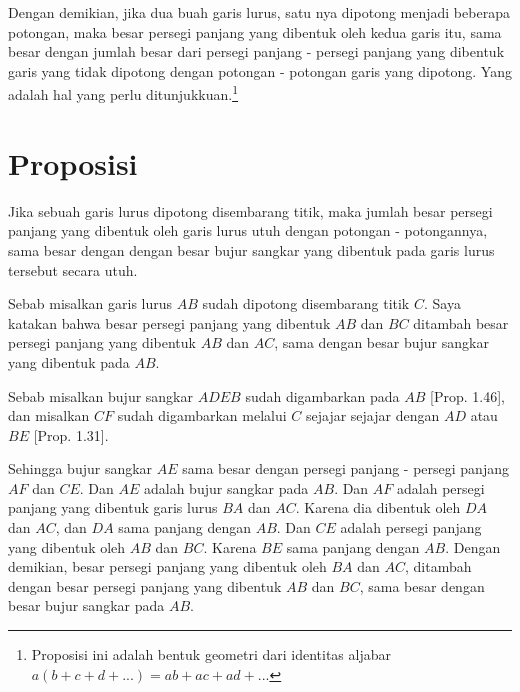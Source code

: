 \documentclass[a4paper]{book}
\begin{document}
Dengan demikian, jika dua buah garis lurus, satu nya dipotong menjadi beberapa
potongan, maka besar persegi panjang yang dibentuk oleh kedua garis itu, sama
besar dengan jumlah besar dari persegi panjang - persegi panjang yang dibentuk 
garis yang tidak dipotong dengan potongan - potongan garis yang dipotong.
Yang adalah hal yang perlu ditunjukkuan.\footnote {Proposisi ini adalah
bentuk geometri dari identitas aljabar $a(b + c + d +...) = ab +ac + ad + ...$}

\section*{\centering Proposisi \thesection} 

Jika sebuah garis lurus dipotong disembarang titik, maka jumlah besar persegi
 panjang yang dibentuk oleh garis lurus utuh dengan potongan 
- potongannya, sama besar dengan dengan besar bujur sangkar yang dibentuk pada garis 
lurus tersebut secara utuh. 
\begin{center}
\end{center}
Sebab misalkan garis lurus $AB$ sudah dipotong disembarang titik $C$. Saya
katakan bahwa besar persegi panjang yang dibentuk $AB$ dan $BC$ ditambah besar persegi
panjang yang dibentuk $AB$ dan $AC$, sama dengan besar bujur sangkar yang dibentuk 
pada $AB$.

Sebab misalkan bujur sangkar $ADEB$ sudah digambarkan pada $AB$ [Prop. 1.46],
dan misalkan $CF$ sudah digambarkan melalui $C$ sejajar sejajar dengan 
$AD$ atau $BE$ [Prop. 1.31].

Sehingga bujur sangkar $AE$ sama besar dengan persegi panjang - persegi panjang 
$AF$ dan $CE$. Dan $AE$ adalah bujur sangkar pada $AB$. Dan $AF$ adalah persegi
panjang yang dibentuk garis lurus $BA$ dan $AC$. Karena dia dibentuk oleh $DA$
dan $AC$, dan $DA$ sama panjang dengan $AB$. Dan $CE$ adalah persegi panjang 
yang dibentuk oleh $AB$ dan $BC$. Karena $BE$ sama panjang dengan $AB$. Dengan
demikian, besar persegi panjang yang dibentuk oleh $BA$ dan $AC$, ditambah dengan besar
persegi panjang yang dibentuk $AB$ dan $BC$, sama besar dengan besar bujur sangkar pada
$AB$.
\end{document}
